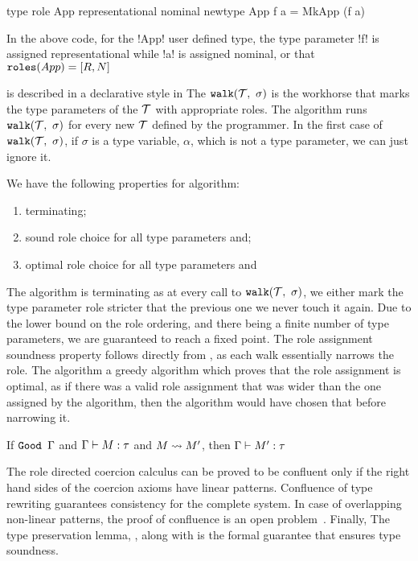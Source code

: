 \documentclass[screen,nonacm,manuscript,review]{acmart} %
\begin{document}
\begin{CenteredBox}
\begin{code}
type role App representational nominal
newtype App f a = MkApp (f a)
\end{code}
\end{CenteredBox}
In the above code, for the !App! user defined type, the type parameter !f! is assigned representational while !a! is assigned nominal, or that $\texttt{roles}(App) = [R, N]$

\RoleInfer is described in a declarative style in 
The $\texttt{walk}(\mathcal{T},~\sigma)$ is the workhorse that marks the type parameters of the $\mathcal{T}$ with appropriate roles. The algorithm \RoleInfer runs $\texttt{walk}(\mathcal{T},~\sigma)$ for every new $\mathcal{T}$ defined by the programmer. In the first case of $\texttt{walk}(\mathcal{T},~\sigma)$, if $\sigma$ is a type variable, $\alpha$, which is not a type parameter, we can just ignore it.

We have the following properties for \RoleInfer algorithm:
\begin{enumerate}
\item terminating;
\item sound role choice for all type parameters and;
\item optimal role choice for all type parameters and
\end{enumerate}

The algorithm is terminating as at every call to $\texttt{walk}(\mathcal{T},~\sigma)$, we either mark the type parameter role stricter that the previous one we never touch it again. Due to the lower bound on the role ordering, and there being a finite number of type parameters, we are guaranteed to reach a fixed point. The role assignment soundness property follows directly from , as each walk essentially narrows the role. The algorithm a greedy algorithm which proves that the role assignment is optimal, as if there was a valid role assignment that was wider than the one assigned by the algorithm, then the algorithm would have chosen that before narrowing it.

\begin{lemma}\label{lem:sfr-preservation}
If $\texttt{Good~}\Gamma$ and $\Gamma \vdash M : \tau$ and $M \rightsquigarrow M'$, then $\Gamma \vdash M' : \tau$
\end{lemma}
The role directed coercion calculus can be proved to be confluent only if the right hand sides of the coercion axioms have linear patterns. Confluence of type rewriting guarantees consistency for the complete system. In case of overlapping non-linear patterns, the proof of confluence is an open problem~\cite{mizuhito_rta_1995}.
Finally, The type preservation lemma, ,
along with  is the formal guarantee that
ensures type soundness.
\end{document}
